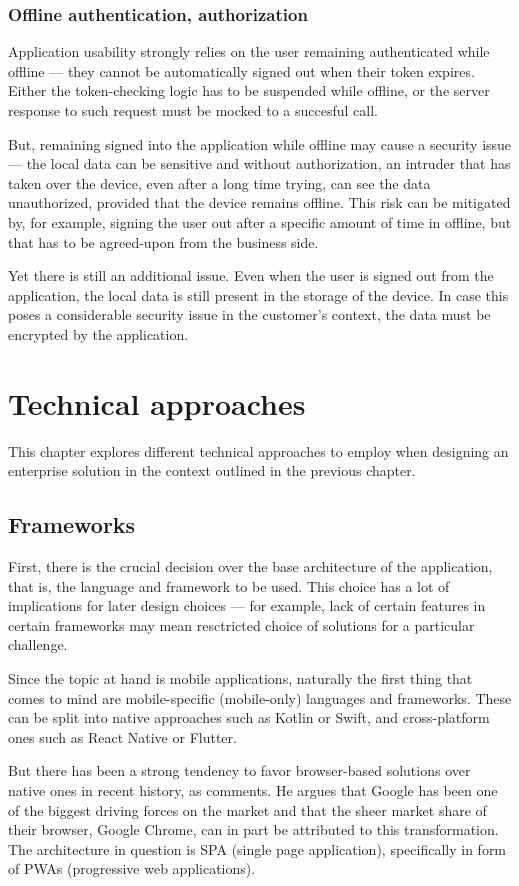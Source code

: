 \documentclass[
  digital,     %
  color,       %
  oneside,     %
  nosansbold,  %
  nocolorbold, %
  lof,         %
  lot,         %
]{fithesis4}
\begin{document}
\subsection{Offline authentication, authorization}
Application usability strongly relies on the user remaining authenticated while offline --- they cannot be automatically signed out when their token expires. Either the token-checking logic has to be suspended while offline, or the server response to such request must be mocked to a succesful call.

But, remaining signed into the application while offline may cause a security issue --- the local data can be sensitive and without authorization, an intruder that has taken over the device, even after a long time trying, can see the data unauthorized, provided that the device remains offline. This risk can be mitigated by, for example, signing the user out after a specific amount of time in offline, but that has to be agreed-upon from the business side. 

Yet there is still an additional issue. Even when the user is signed out from the application, the local data is still present in the storage of the device. In case this poses a considerable security issue in the customer's context, the data must be encrypted by the application.

\chapter{Technical approaches}
This chapter explores different technical approaches to employ when designing an enterprise solution in the context outlined in the previous chapter.
\section{Frameworks}
First, there is the crucial decision over the base architecture of the application, that is, the language and framework to be used. This choice has a lot of implications for later design choices --- for example, lack of certain features in certain frameworks may mean resctricted choice of solutions for a particular challenge.

Since the topic at hand is mobile applications, naturally the first thing that comes to mind are mobile-specific (mobile-only) languages and frameworks. These can be split into native approaches such as Kotlin or Swift, and cross-platform ones such as React Native or Flutter. 

But there has been a strong tendency to favor browser-based solutions over native ones in recent history, as \cite{WebAppsReplacingNative} comments. He argues that Google has been one of the biggest driving forces on the market and that the sheer market share of their browser, Google Chrome, can in part be attributed to this transformation. The architecture in question is SPA (single page application), specifically in form of PWAs (progressive web applications). 
\end{document}
